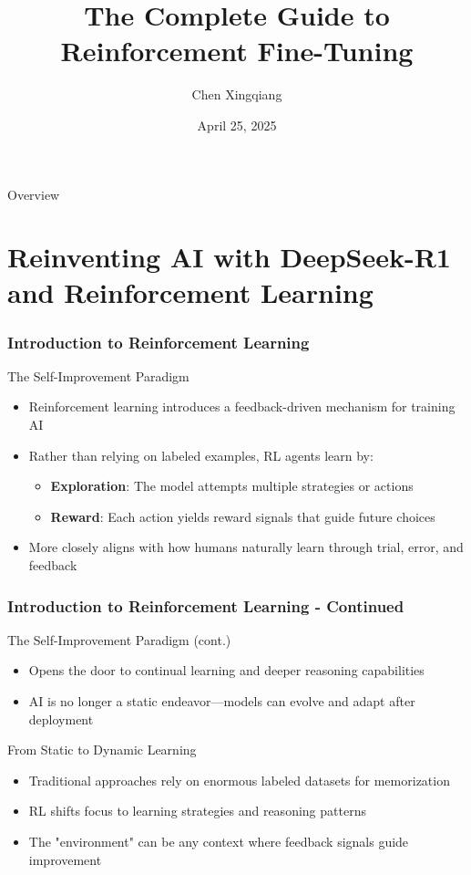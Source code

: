 \documentclass[aspectratio=169]{beamer}
\title[RFT Guide 2025]{The Complete Guide to Reinforcement Fine-Tuning}
\author{Chen Xingqiang}
\institute[Yizhu Intelligent Ltd]{
	Yizhu Intelligent Ltd\\
	Hangzhou, China
}
\date[2025-04-25]{April 25, 2025}
\begin{document}
\begin{frame}
	\maketitle
\end{frame}

\begin{frame}[label=inhalt]{Overview}
	\tableofcontents
\end{frame}

\section{Reinventing AI with DeepSeek-R1 and Reinforcement Learning}

\begin{frame}
	\frametitle{Introduction to Reinforcement Learning}
	\begin{block}{The Self-Improvement Paradigm}
		\begin{itemize}
			\item Reinforcement learning introduces a feedback-driven mechanism for training AI
			\item Rather than relying on labeled examples, RL agents learn by:
			\begin{itemize}
				\item \textbf{Exploration}: The model attempts multiple strategies or actions
				\item \textbf{Reward}: Each action yields reward signals that guide future choices
			\end{itemize}
			\item More closely aligns with how humans naturally learn through trial, error, and feedback
		\end{itemize}
	\end{block}
\end{frame}

\begin{frame}
	\frametitle{Introduction to Reinforcement Learning - Continued}
	\begin{block}{The Self-Improvement Paradigm (cont.)}
		\begin{itemize}
			\item Opens the door to continual learning and deeper reasoning capabilities
			\item AI is no longer a static endeavor—models can evolve and adapt after deployment
		\end{itemize}
	\end{block}
	\begin{block}{From Static to Dynamic Learning}
		\begin{itemize}
			\item Traditional approaches rely on enormous labeled datasets for memorization
			\item RL shifts focus to learning strategies and reasoning patterns
			\item The "environment" can be any context where feedback signals guide improvement
		\end{itemize}
	\end{block}
\end{frame}
\end{document}
